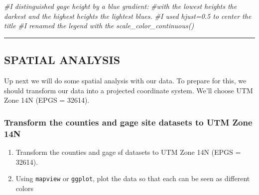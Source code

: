 \documentclass[
]{article}
\newenvironment{Shaded}{\begin{snugshade}}{\end{snugshade}}
\newcommand{\CommentTok}[1]{\textcolor[rgb]{0.56,0.35,0.01}{\textit{#1}}}
\providecommand{\tightlist}{%
  \setlength{\itemsep}{0pt}\setlength{\parskip}{0pt}}
\begin{document}
\begin{Shaded}
\begin{Highlighting}[]
\CommentTok{\#I distinguished gage height by a blue gradient:}
\CommentTok{\#with the lowest heights the darkest and the highest heights the lightest blues.}
\CommentTok{\#I used hjust=0.5 to center the title}
\CommentTok{\#I renamed the legend with the scale\_color\_continuous()}
\end{Highlighting}
\end{Shaded}

\begin{center}\rule{0.5\linewidth}{0.5pt}\end{center}

\hypertarget{spatial-analysis}{%
\subsection{SPATIAL ANALYSIS}\label{spatial-analysis}}

Up next we will do some spatial analysis with our data. To prepare for
this, we should transform our data into a projected coordinate system.
We'll choose UTM Zone 14N (EPGS = 32614).

\hypertarget{transform-the-counties-and-gage-site-datasets-to-utm-zone-14n}{%
\subsubsection{Transform the counties and gage site datasets to UTM Zone
14N}\label{transform-the-counties-and-gage-site-datasets-to-utm-zone-14n}}

\begin{enumerate}
\def\labelenumi{\arabic{enumi}.}
\setcounter{enumi}{19}
\tightlist
\item
  Transform the counties and gage sf datasets to UTM Zone 14N (EPGS =
  32614).
\item
  Using \texttt{mapview} or \texttt{ggplot}, plot the data so that each
  can be seen as different colors
\end{enumerate}
\end{document}
